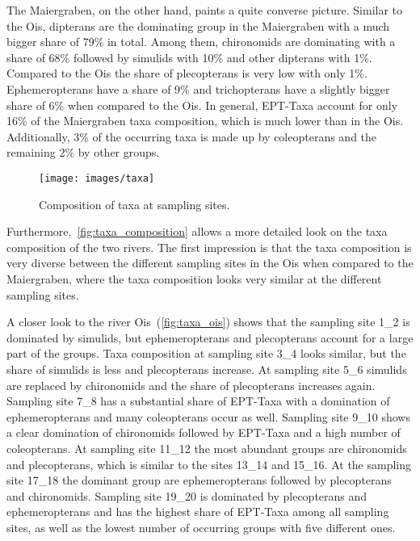 The Maiergraben, on the other hand, paints a quite converse picture. Similar to the Ois, dipterans are the dominating group in the Maiergraben with a much bigger share of 79\% in total. Among them, chironomids are dominating with a share of 68\% followed by simulids with 10\% and other dipterans with 1\%. Compared to the Ois the share of plecopterans is very low with only 1\%. Ephemeropterans have a share of 9\% and trichopterans have a slightly bigger share of 6\% when compared to the Ois. In general, EPT-Taxa account for only 16\% of the Maiergraben taxa composition, which is much lower than in the Ois. Additionally, 3\% of the occurring taxa is made up by coleopterans and the remaining 2\% by other groups.

\begin{figure}[!htb]                              %
  \center
  \texttt{[image: images/taxa]}                 %
  \caption{Composition of taxa at sampling sites.}                        %
  \label{fig:taxa}                                                        %
\end{figure}

Furthermore,~\cref{fig:taxa_composition} allows a more detailed look on the taxa composition of the two rivers. The first impression is that the taxa composition is very diverse between the different sampling sites in the Ois when compared to the Maiergraben, where the taxa composition looks very similar at the different sampling sites.

A closer look to the river Ois~(\cref{fig:taxa_ois}) shows that the sampling site {1\_2} is dominated by simulids, but ephemeropterans and plecopterans account for a large part of the groups. Taxa composition at sampling site 3\_4 looks similar, but the share of simulids is less and plecopterans increase. At sampling site {5\_6} simulids are replaced by chironomids and the share of plecopterans increases again. Sampling site {7\_8} has a substantial share of EPT-Taxa with a domination of ephemeropterans and many coleopterans occur as well. Sampling site {9\_10} shows a clear domination of chironomids followed by EPT-Taxa and a high number of coleopterans. At sampling site {11\_12} the most abundant groups are chironomids and plecopterans, which is similar to the sites 13\_14 and 15\_16. At the sampling site {17\_18} the dominant group are ephemeropterans followed by plecopterans and chironomids. Sampling site {19\_20} is dominated by plecopterans and ephemeropterans and has the highest share of EPT-Taxa among all sampling sites, as well as the lowest number of occurring groups with five different ones.



